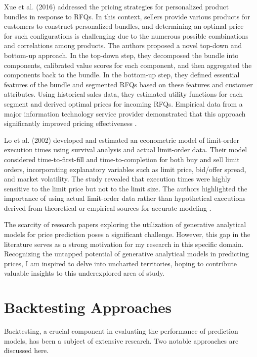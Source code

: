 Xue et al. (2016) addressed the pricing strategies for personalized product bundles in response to RFQs. In this context, sellers provide various products for customers to construct personalized bundles, and determining an optimal price for such configurations is challenging due to the numerous possible combinations and correlations among products. The authors proposed a novel top-down and bottom-up approach. In the top-down step, they decomposed the bundle into components, calibrated value scores for each component, and then aggregated the components back to the bundle. In the bottom-up step, they defined essential features of the bundle and segmented RFQs based on these features and customer attributes. Using historical sales data, they estimated utility functions for each segment and derived optimal prices for incoming RFQs. Empirical data from a major information technology service provider demonstrated that this approach significantly improved pricing effectiveness \cite{xue2016pricing}.

Lo et al. (2002) developed and estimated an econometric model of limit-order execution times using survival analysis and actual limit-order data. Their model considered time-to-first-fill and time-to-completion for both buy and sell limit orders, incorporating explanatory variables such as limit price, bid/offer spread, and market volatility. The study revealed that execution times were highly sensitive to the limit price but not to the limit size. The authors highlighted the importance of using actual limit-order data rather than hypothetical executions derived from theoretical or empirical sources for accurate modeling \cite{lo2002econometric}.

The scarcity of research papers exploring the utilization of generative analytical models for price prediction poses a significant challenge. However, this gap in the literature serves as a strong motivation for my research in this specific domain. Recognizing the untapped potential of generative analytical models in predicting prices, I am inspired to delve into uncharted territories, hoping to contribute valuable insights to this underexplored area of study.

\section{Backtesting Approaches}
Backtesting, a crucial component in evaluating the performance of prediction models, has been a subject of extensive research. Two notable approaches are discussed here.

